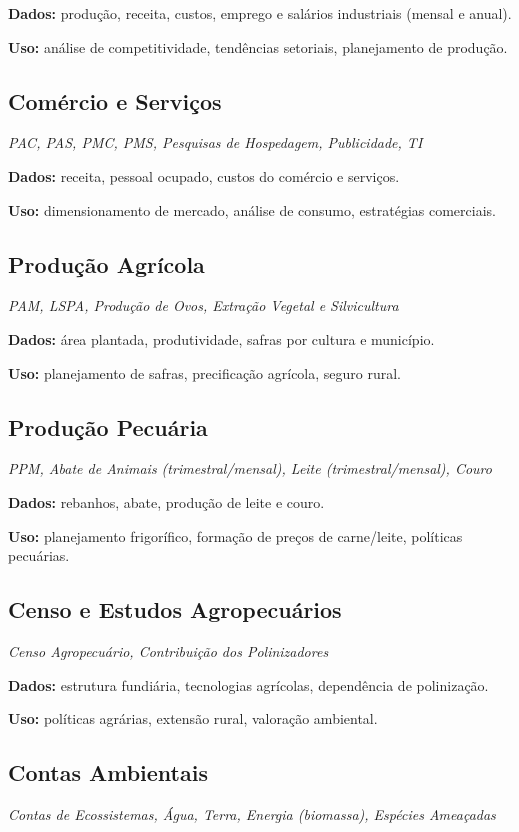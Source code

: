 \documentclass[12pt,a4paper]{article}
\begin{document}
\textbf{Dados:} produção, receita, custos, emprego e salários industriais (mensal e anual).

\textbf{Uso:} análise de competitividade, tendências setoriais, planejamento de produção.

\subsection{Comércio e Serviços}
\textit{PAC, PAS, PMC, PMS, Pesquisas de Hospedagem, Publicidade, TI}

\textbf{Dados:} receita, pessoal ocupado, custos do comércio e serviços.

\textbf{Uso:} dimensionamento de mercado, análise de consumo, estratégias comerciais.

\subsection{Produção Agrícola}
\textit{PAM, LSPA, Produção de Ovos, Extração Vegetal e Silvicultura}

\textbf{Dados:} área plantada, produtividade, safras por cultura e município.

\textbf{Uso:} planejamento de safras, precificação agrícola, seguro rural.

\subsection{Produção Pecuária}
\textit{PPM, Abate de Animais (trimestral/mensal), Leite (trimestral/mensal), Couro}

\textbf{Dados:} rebanhos, abate, produção de leite e couro.

\textbf{Uso:} planejamento frigorífico, formação de preços de carne/leite, políticas pecuárias.

\subsection{Censo e Estudos Agropecuários}
\textit{Censo Agropecuário, Contribuição dos Polinizadores}

\textbf{Dados:} estrutura fundiária, tecnologias agrícolas, dependência de polinização.

\textbf{Uso:} políticas agrárias, extensão rural, valoração ambiental.

\subsection{Contas Ambientais}
\textit{Contas de Ecossistemas, Água, Terra, Energia (biomassa), Espécies Ameaçadas}
\end{document}
